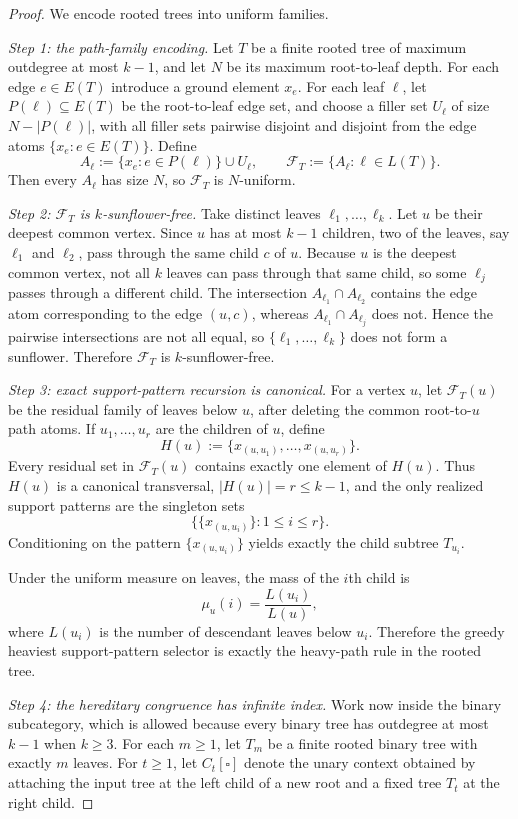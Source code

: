 \documentclass[11pt]{article}
\theoremstyle{definition}
\newcommand{\F}{\mathcal{F}}
\newcommand{\1}{\mathbf{1}}
\begin{document}
\begin{proof}
We encode rooted trees into uniform families.

\smallskip
\noindent\emph{Step 1: the path-family encoding.}
Let $T$ be a finite rooted tree of maximum outdegree at most $k-1$, and let $N$ be its maximum root-to-leaf depth.
For each edge $e\in E(T)$ introduce a ground element $x_e$.
For each leaf $\ell$, let $P(\ell)\subseteq E(T)$ be the root-to-leaf edge set, and choose a filler set $U_\ell$ of size $N-|P(\ell)|$, with all filler sets pairwise disjoint and disjoint from the edge atoms $\{x_e:e\in E(T)\}$.
Define
\[
A_\ell:=\{x_e:e\in P(\ell)\}\cup U_\ell,
\qquad
\F_T:=\{A_\ell:\ell\in L(T)\}.
\]
Then every $A_\ell$ has size $N$, so $\F_T$ is $N$-uniform.

\smallskip
\noindent\emph{Step 2: $\F_T$ is $k$-sunflower-free.}
Take distinct leaves $\ell_1,\dots,\ell_k$.
Let $u$ be their deepest common vertex.
Since $u$ has at most $k-1$ children, two of the leaves, say $\ell_1$ and $\ell_2$, pass through the same child $c$ of $u$.
Because $u$ is the deepest common vertex, not all $k$ leaves can pass through that same child, so some $\ell_j$ passes through a different child.
The intersection $A_{\ell_1}\cap A_{\ell_2}$ contains the edge atom corresponding to the edge $(u,c)$, whereas $A_{\ell_1}\cap A_{\ell_j}$ does not.
Hence the pairwise intersections are not all equal, so $\{\ell_1,\dots,\ell_k\}$ does not form a sunflower.
Therefore $\F_T$ is $k$-sunflower-free.

\smallskip
\noindent\emph{Step 3: exact support-pattern recursion is canonical.}
For a vertex $u$, let $\F_T(u)$ be the residual family of leaves below $u$, after deleting the common root-to-$u$ path atoms.
If $u_1,\dots,u_r$ are the children of $u$, define
\[
H(u):=\{x_{(u,u_1)},\dots,x_{(u,u_r)}\}.
\]
Every residual set in $\F_T(u)$ contains exactly one element of $H(u)$.
Thus $H(u)$ is a canonical transversal, $|H(u)|=r\le k-1$, and the only realized support patterns are the singleton sets
\[
\bigl\{\{x_{(u,u_i)}\}:1\le i\le r\bigr\}.
\]
Conditioning on the pattern $\{x_{(u,u_i)}\}$ yields exactly the child subtree $T_{u_i}$.

Under the uniform measure on leaves, the mass of the $i$th child is
\[
\mu_u(i)=\frac{L(u_i)}{L(u)},
\]
where $L(u_i)$ is the number of descendant leaves below $u_i$.
Therefore the greedy heaviest support-pattern selector is exactly the heavy-path rule in the rooted tree.

\smallskip
\noindent\emph{Step 4: the hereditary congruence has infinite index.}
Work now inside the binary subcategory, which is allowed because every binary tree has outdegree at most $k-1$ when $k\ge 3$.
For each $m\ge 1$, let $T_m$ be a finite rooted binary tree with exactly $m$ leaves.
For $t\ge 1$, let $C_t[\square]$ denote the unary context obtained by attaching the input tree at the left child of a new root and a fixed tree $T_t$ at the right child.


\end{proof}
\end{document}
